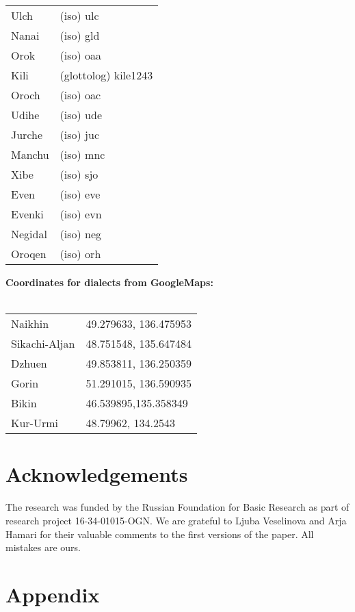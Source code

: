 \documentclass[output=paper]{langscibook}
\begin{document}
\begin{tabularx}{.45\textwidth}{lQ}
    Ulch & (iso) ulc\\
    Nanai & (iso) gld\\
    Orok & (iso) oaa\\
    Kili & (glottolog) kile1243\\
    Oroch & (iso) oac\\
    Udihe & (iso) ude\\
    Jurche & (iso) juc\\
    Manchu & (iso) mnc\\
    Xibe & (iso) sjo\\
    Even & (iso) eve\\
    Evenki & (iso) evn\\
    Negidal & (iso) neg\\
    Oroqen & (iso) orh\\
\end{tabularx}

\newpage
\textbf{Coordinates for dialects from GoogleMaps:}\\
\\
\begin{tabularx}{.6\textwidth}{lQ}
    Naikhin & 49.279633, 136.475953\\
    Sikachi-Aljan & 48.751548, 135.647484\\
    Dzhuen & 49.853811, 136.250359\\
    Gorin & 51.291015, 136.590935\\
    Bikin & 46.539895,135.358349\\
    Kur-Urmi & 48.79962, 134.2543\\
\end{tabularx}

\section*{Acknowledgements}
The research was funded by the Russian Foundation for Basic Research as part of research project 16-34-01015-OGN. We are grateful to Ljuba Veselinova and Arja Hamari for their valuable comments to the first versions of the paper. All mistakes are ours.

\pagebreak
\newpage
\section*{Appendix}


\pagebreak
\newpage


\pagebreak
\newpage
\end{document}

